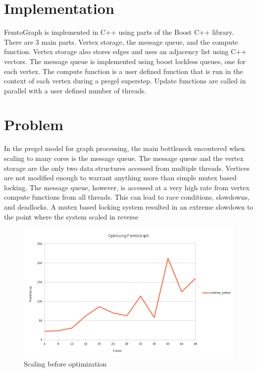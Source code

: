 \documentclass{sig-alternate-05-2015}
\begin{document}
\section{Implementation}
\justify
FemtoGraph is implemented in C++ using parts of the Boost C++ library. There are 3 main parts. Vertex storage, the message queue, and the compute function. Vertex storage also stores edges and uses  an adjacency list using C++ vectors. The message queue is implemented using boost lockless queues, one for each vertex. The compute function is a user defined function that is run in the context of each vertex during a pregel superstep. Update functions are called in parallel with a user defined number of threads.

\section{Problem}
\justify
In the pregel model for graph processing, the main bottleneck encoutered when scaling to many cores is the message queue. The message queue and the vertex storage are the only two data structures accessed from multiple threads. Vertices are not modified enough to warrant anything more than simple mutex based locking. The message queue, however, is accessed at a very high rate from vertex compute functions from all threads. This can lead to race conditions, slowdowns, and deadlocks. A mutex based locking system resulted in an extreme slowdown to the point where the system scaled in reverse
\begin{figure}
  \centering
  \includegraphics[width=\columnwidth]{before.png}
  \caption{Scaling before optimization}
\end{figure}
\end{document}
